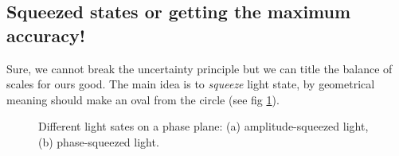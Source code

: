 \subsection{Squeezed states or getting the maximum accuracy!}

Sure, we cannot break the uncertainty principle but we can title the balance of scales for ours good. The main idea is to \textit{squeeze} light state, by geometrical meaning should make an oval from the circle (see fig \ref{fig:sheeeeeeit}).

\begin{figure}[h]
	\begin{minipage}{0.5 \linewidth}
	\end{minipage}
	\hfill
	\begin{minipage}{0.5 \linewidth}
	\end{minipage}
	\caption{Different light sates on a phase plane: (a) amplitude-squeezed light, (b) phase-squeezed light.}
	\label{fig:sheeeeeeit}
\end{figure}

